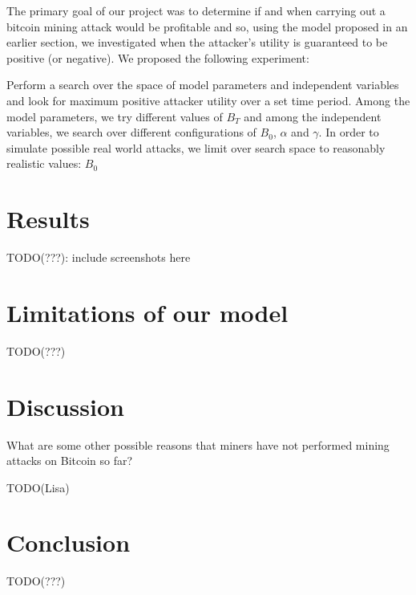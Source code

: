 \documentclass[12pt]{article}
\begin{document}
The primary goal of our project was to determine if and when carrying out a bitcoin mining attack would be profitable and so, using the model proposed in an earlier section, we investigated when the attacker's utility is guaranteed to be positive (or negative). We proposed the following experiment:

Perform a search over the space of model parameters and independent variables and look for maximum positive attacker utility over a set time period. Among the model parameters, we try different values of $B_T$ and among the independent variables, we search over different configurations of $B_0$, $\alpha$ and $\gamma$. In order to simulate possible real world attacks, we limit over search space to reasonably realistic values: $B_0$


\section{Results}

TODO(???): include screenshots here



\section{Limitations of our model}

TODO(???)

\section{Discussion}
What are some other possible reasons that miners have not performed mining attacks on Bitcoin so far?

TODO(Lisa)

\section{Conclusion}

TODO(???)



\end{document}

